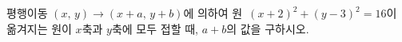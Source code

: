 평행이동 $(x,\,y)\longrightarrow(x+a,\,y+b)$에 의하여 원~$(x+2)^2+(y-3)^2=16$이 옮겨지는 원이 $x$축과 $y$축에 모두 접할 때, $a+b$의 값을 구하시오. 
